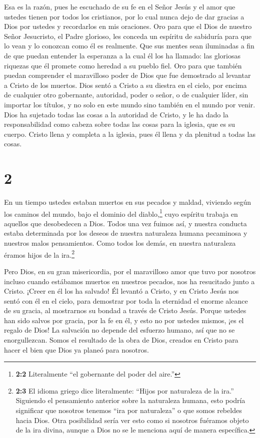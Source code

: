  Esa es la razón, pues he escuchado de su fe en el Señor
Jesús y el amor que ustedes tienen por todos los cristianos,
 por lo cual nunca dejo de dar gracias a Dios por ustedes y
recordarlos en mis oraciones.  Oro para que el Dios de
nuestro Señor Jesucristo, el Padre glorioso, les conceda un espíritu de
sabiduría para que lo vean y lo conozcan como él es realmente.
 Que sus mentes sean iluminadas a fin de que puedan
entender la esperanza a la cual él los ha llamado:  las
gloriosas riquezas que él promete como heredad a su pueblo fiel. Oro
para que también puedan comprender el maravilloso poder de Dios
 que fue demostrado al levantar a Cristo de los muertos.
Dios sentó a Cristo a su diestra en el cielo,  por encima
de cualquier otro gobernante, autoridad, poder o señor, o de cualquier
líder, sin importar los títulos, y no solo en este mundo sino también en
el mundo por venir.  Dios ha sujetado todas las cosas a la
autoridad de Cristo, y le ha dado la responsabilidad como cabeza sobre
todas las cosas para la iglesia,  que es su cuerpo. Cristo
llena y completa a la iglesia, pues él llena y da plenitud a todas las
cosas.

\hypertarget{section-1}{%
\section{2}\label{section-1}}

 En un tiempo ustedes estaban muertos en sus pecados y
maldad,  viviendo según los caminos del mundo, bajo el
dominio del diablo,\footnote{\textbf{2:2} Literalmente ``el gobernante
  del poder del aire.''} cuyo espíritu trabaja en aquellos que
desobedecen a Dios.  Todos una vez fuimos así, y nuestra
conducta estaba determinada por los deseos de nuestra naturaleza humana
pecaminosa y nuestros malos pensamientos. Como todos los demás, en
nuestra naturaleza éramos hijos de la ira.\footnote{\textbf{2:3} El
  idioma griego dice literalmente: ``Hijos por naturaleza de la ira.''
  Siguiendo el pensamiento anterior sobre la naturaleza humana, esto
  podría significar que nosotros tenemos ``ira por naturaleza'' o que
  somos rebeldes hacia Dios. Otra posibilidad sería ver esto como si
  nosotros fuéramos objeto de la ira divina, aunque a Dios no se le
  menciona aquí de manera específica.}

 Pero Dios, en su gran misericordia, por el maravilloso amor
que tuvo por nosotros  incluso cuando estábamos muertos en
nuestros pecados, nos ha resucitado junto a Cristo. ¡Creer en él los ha
salvado!  Él levantó a Cristo, y en Cristo Jesús nos sentó
con él en el cielo,  para demostrar por toda la eternidad el
enorme alcance de su gracia, al mostrarnos su bondad a través de Cristo
Jesús.  Porque ustedes han sido salvos por gracia, por la fe
en él, y esto no por ustedes mismos, ¡es el regalo de Dios! 
La salvación no depende del esfuerzo humano, así que no se
enorgullezcan.  Somos el resultado de la obra de Dios,
creados en Cristo para hacer el bien que Dios ya planeó para nosotros.

